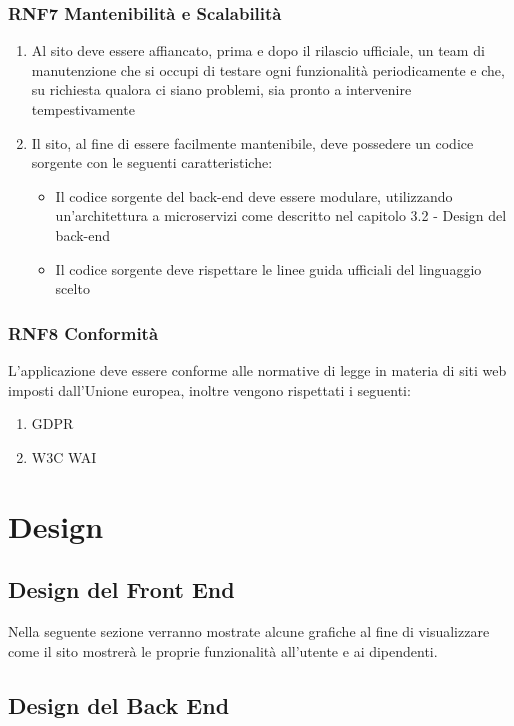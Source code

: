 \documentclass{report}
\begin{document}
\subsection*{RNF7 Mantenibilità e Scalabilità}
\begin{enumerate}
	\item Al sito deve essere affiancato, prima e dopo il rilascio ufficiale, un team di manutenzione che si occupi di testare ogni funzionalità periodicamente e che, su richiesta qualora ci siano problemi, sia pronto a intervenire tempestivamente
	\item Il sito, al fine di essere facilmente mantenibile, deve possedere un codice sorgente con le seguenti caratteristiche:
	\begin{itemize}
		\item Il codice sorgente del back-end deve essere modulare, utilizzando un'architettura a microservizi come descritto nel capitolo 3.2 - Design del back-end
		\item Il codice sorgente deve rispettare le linee guida ufficiali del linguaggio scelto
	
	\end{itemize} 
\end{enumerate}
\subsection*{RNF8 Conformità}
L'applicazione deve essere conforme alle normative di legge in materia di siti web imposti dall'Unione europea, inoltre vengono rispettati i seguenti:
\begin{enumerate}
	\item GDPR
	\item W3C WAI
\end{enumerate}
\chapter{Design}

\section{Design del Front End}

Nella seguente sezione verranno mostrate alcune grafiche al fine di visualizzare come il sito mostrerà le proprie funzionalità all’utente e ai dipendenti.


\section{Design del Back End}
\end{document}

